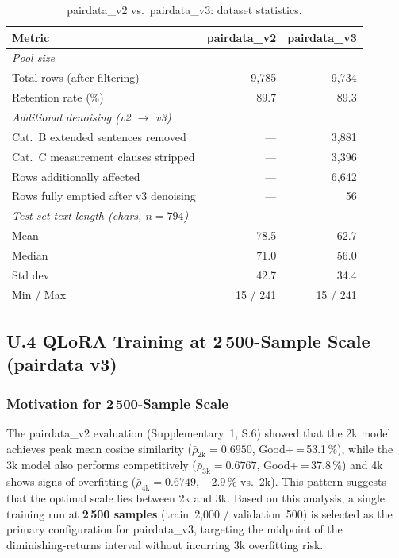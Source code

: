 \documentclass[onecolumn]{article}
\begin{document}
\begin{table}[h]
\centering
\caption{pairdata\_v2 vs.\ pairdata\_v3: dataset statistics.}
\label{tab:u3_pairdata_stats}
\small
\begin{tabular}{l r r}
\toprule
\textbf{Metric} & \textbf{pairdata\_v2} & \textbf{pairdata\_v3} \\
\midrule
\multicolumn{3}{l}{\textit{Pool size}} \\
\quad Total rows (after filtering) & 9,785 & 9,734 \\
\quad Retention rate (\%) & 89.7 & 89.3 \\
\midrule
\multicolumn{3}{l}{\textit{Additional denoising (v2 $\to$ v3)}} \\
\quad Cat.\ B extended sentences removed & --- & 3,881 \\
\quad Cat.\ C measurement clauses stripped & --- & 3,396 \\
\quad Rows additionally affected & --- & 6,642 \\
\quad Rows fully emptied after v3 denoising & --- & 56 \\
\midrule
\multicolumn{3}{l}{\textit{Test-set text length (chars, $n=794$)}} \\
\quad Mean & 78.5 & 62.7 \\
\quad Median & 71.0 & 56.0 \\
\quad Std dev & 42.7 & 34.4 \\
\quad Min / Max & 15 / 241 & 15 / 241 \\
\bottomrule
\end{tabular}
\end{table}

\subsection*{U.4 QLoRA Training at 2\,500-Sample Scale (pairdata v3)}
\label{sec:u4_training}

\subsubsection*{Motivation for 2\,500-Sample Scale}

The pairdata\_v2 evaluation (Supplementary~1, S.6) showed that the
2k model achieves peak mean cosine similarity
($\bar{\rho}_{2\text{k}}=0.6950$, Good$+$\,=\,53.1\,\%),
while the 3k model also performs competitively
($\bar{\rho}_{3\text{k}}=0.6767$, Good$+$\,=\,37.8\,\%)
and 4k shows signs of overfitting
($\bar{\rho}_{4\text{k}}=0.6749$, $-2.9$\,\% vs.\ 2k).
This pattern suggests that the optimal scale lies between 2k and 3k.
Based on this analysis, a single training run at \textbf{2\,500 samples}
(train~2{,}000 / validation~500) is selected as the primary configuration
for pairdata\_v3, targeting the midpoint of the diminishing-returns interval
without incurring 3k overfitting risk.
\end{document}

